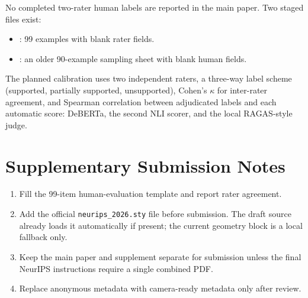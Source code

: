 No completed two-rater human labels are reported in the main paper. Two staged
files exist:
\begin{itemize}[leftmargin=1.6em,itemsep=2pt,topsep=2pt]
  \item {}: 99 examples
  with blank rater fields.
  \item {}: an older 90-example sampling
  sheet with blank human fields.
\end{itemize}
The planned calibration uses two independent raters, a three-way label scheme
(supported, partially supported, unsupported), Cohen's $\kappa$ for inter-rater
agreement, and Spearman correlation between adjudicated labels and each
automatic score: DeBERTa, the second NLI scorer, and the local RAGAS-style
judge.

\section{Supplementary Submission Notes}

\begin{enumerate}[leftmargin=1.6em,itemsep=2pt,topsep=2pt]
  \item Fill the 99-item human-evaluation template and report rater agreement.
  \item Add the official \texttt{neurips\_2026.sty} file before submission.
  The draft source already loads it automatically if present; the current
  geometry block is a local fallback only.
  \item Keep the main paper and supplement separate for submission unless the
  final NeurIPS instructions require a single combined PDF.
  \item Replace anonymous metadata with camera-ready metadata only after review.
\end{enumerate}
